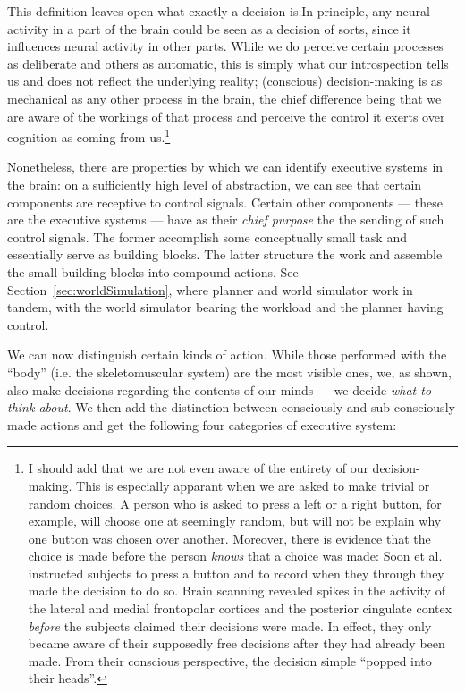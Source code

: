 This definition leaves open what exactly a decision is.In principle, any neural activity in a part of the brain could be seen as a decision of sorts, since it influences neural activity in other parts. While we do perceive certain processes as deliberate and others as automatic, this is simply what our introspection tells us and does not reflect the underlying reality; (conscious) decision-making is as mechanical as any other process in the brain, the chief difference being that we are aware of the workings of that process and perceive the control it exerts over cognition as coming from us.\footnote{I should add that we are not even aware of the entirety of our decision-making. This is especially apparant when we are asked to make trivial or random choices. A person who is asked to press a left or a right button, for example, will choose one at seemingly random, but will not be explain why one button was chosen over another. Moreover, there is evidence that the choice is made before the person {\em knows} that a choice was made: Soon et al. \cite{soon2008} instructed subjects to press a button and to record when they through they made the decision to do so. Brain scanning revealed spikes in the activity of the lateral and medial frontopolar cortices and the posterior cingulate contex {\em before} the subjects claimed their decisions were made. In effect, they only became aware of their supposedly free decisions after they had already been made. From their conscious perspective, the decision simple ``popped into their heads''.}

Nonetheless, there are properties by which we can identify executive systems in the brain: on a sufficiently high level of abstraction, we can see that certain components are receptive to control signals. Certain other components --- these are the executive systems --- have as their {\em chief purpose} the the sending of such control signals. The former accomplish some conceptually small task and essentially serve as building blocks. The latter structure the work and assemble the small building blocks into compound actions. See Section~\ref{sec:worldSimulation}, where planner and world simulator work in tandem, with the world simulator bearing the workload and the planner having control.

We can now distinguish certain kinds of action. While those performed with the ``body'' (i.e. the skeletomuscular system) are the most visible ones, we, as shown, also make decisions regarding the contents of our minds --- we decide {\em what to think about}. We then add the distinction between consciously and sub-consciously made actions and get the following four categories of executive system:

